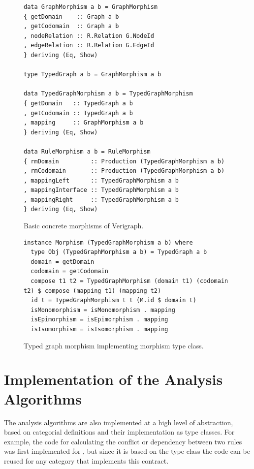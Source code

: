 \begin{figure}[!ht]
\caption{Basic concrete morphisms of Verigraph.}
\begin{verbatim}
data GraphMorphism a b = GraphMorphism 
{ getDomain    :: Graph a b
, getCodomain  :: Graph a b
, nodeRelation :: R.Relation G.NodeId
, edgeRelation :: R.Relation G.EdgeId
} deriving (Eq, Show)

type TypedGraph a b = GraphMorphism a b

data TypedGraphMorphism a b = TypedGraphMorphism 
{ getDomain   :: TypedGraph a b
, getCodomain :: TypedGraph a b
, mapping     :: GraphMorphism a b
} deriving (Eq, Show)

data RuleMorphism a b = RuleMorphism 
{ rmDomain         :: Production (TypedGraphMorphism a b)
, rmCodomain       :: Production (TypedGraphMorphism a b)
, mappingLeft      :: TypedGraphMorphism a b
, mappingInterface :: TypedGraphMorphism a b
, mappingRight     :: TypedGraphMorphism a b
} deriving (Eq, Show)
\end{verbatim}
\label{fig:verigraph:concrete-morphisms}
\end{figure}

\begin{figure}[!ht]
\caption{Typed graph morphism implementing morphism type class.}
\begin{verbatim}
instance Morphism (TypedGraphMorphism a b) where
  type Obj (TypedGraphMorphism a b) = TypedGraph a b
  domain = getDomain
  codomain = getCodomain
  compose t1 t2 = TypedGraphMorphism (domain t1) (codomain t2) $ compose (mapping t1) (mapping t2)
  id t = TypedGraphMorphism t t (M.id $ domain t)
  isMonomorphism = isMonomorphism . mapping
  isEpimorphism = isEpimorphism . mapping
  isIsomorphism = isIsomorphism . mapping
\end{verbatim}
\label{fig:verigraph:morphism-implementation}
\end{figure}

\section{Implementation of the Analysis Algorithms}

The analysis algorithms are also implemented at a high level of abstraction, based on categorial definitions and their implementation as type classes. For example, the code for calculating the conflict or dependency between two rules was first implemented for , but since it is based on the  type class the code can be reused for any category that implements this contract.

